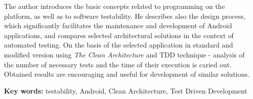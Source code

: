 The author introduces the basic concepts related to programming on the platform, as well as to software testability. He describes also the design process, which significantly facilitates the maintenance and development of Android applications, and compares selected architectural solutions in the context of automated testing. On the basis of the selected application in standard and modified version using \textit{The Clean Architecture} and TDD technique -  analysis of the number of necessary tests and the time of their execution is caried out. Obtained results are encouraging and useful for development of similar solutions.
\vspace{7 pt}

\textbf{Key words:} testability, Android, Clean Architecture, Test Driven Development


